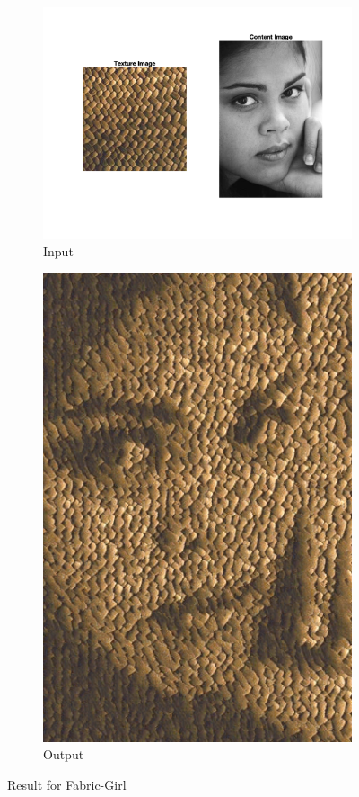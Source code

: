 \documentclass[10pt,twocolumn,letterpaper]{article}
\begin{document}
\begin{figure}[h]
    \centering
    \begin{subfigure}[h]{0.45\textwidth}
        \centering
        \includegraphics[trim={2cm 4cm 2cm 1cm}, clip, scale=0.5]{../results/bsize/inp_fabric_girl.png}
        \caption{Input}
    \end{subfigure}
    \hfill
    \begin{subfigure}[h]{0.5\textwidth}
       \centering
       \includegraphics[scale=0.4]{../results/bsize/out_fabric_girl_B_10_bdr_0_800000.png}
       \caption{Output}
   \end{subfigure}
   \caption{Result for Fabric-Girl}
   \label{fig:ap_bs}
\end{figure}
\end{document}
